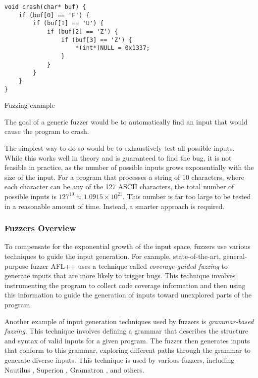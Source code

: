 \begin{listing}[htp]
	\centering
	\begin{minipage}{.6\linewidth}
		\begin{verbatim}
void crash(char* buf) {
	if (buf[0] == 'F') {
		if (buf[1] == 'U') {
			if (buf[2] == 'Z') {
				if (buf[3] == 'Z') {
					*(int*)NULL = 0x1337;
				}
			}
		}
	}
}
		\end{verbatim}
	\end{minipage}
	\caption{Fuzzing example}
	\label{lst:example1}
\end{listing}

The goal of a generic fuzzer would be to automatically find an input that would cause the program to crash.

The simplest way to do so would be to exhaustively test all possible inputs. While this works well in theory and is guaranteed to find the bug, it is not feasible in practice, as the number of possible inputs grows exponentially with the size of the input. For a program that processes a string of 10 characters, where each character can be any of the 127 ASCII characters, the total number of possible inputs is $127^{10} \approx 1.0915 \times 10^{21}$. This number is far too large to be tested in a reasonable amount of time. Instead, a smarter approach is required.

\subsubsection{Fuzzers Overview}

To compensate for the exponential growth of the input space, fuzzers use various techniques to guide the input generation. For example, state-of-the-art, general-purpose fuzzer AFL++ \cite{AFLplusplus-Woot20} uses a technique called \textit{coverage-guided fuzzing} to generate inputs that are more likely to trigger bugs. This technique involves instrumenting the program to collect code coverage information and then using this information to guide the generation of inputs toward unexplored parts of the program.

Another example of input generation techniques used by fuzzers is \textit{grammar-based fuzzing}. This technique involves defining a grammar that describes the structure and syntax of valid inputs for a given program. The fuzzer then generates inputs that conform to this grammar, exploring different paths through the grammar to generate diverse inputs. This technique is used by various fuzzers, including Nautilus \cite{nautilus-grammar-fuzzer}, Superion \cite{superion-grammar-fuzzer}, Gramatron \cite{gramatron-effective-grammar-aware-fuzzing}, and others.

